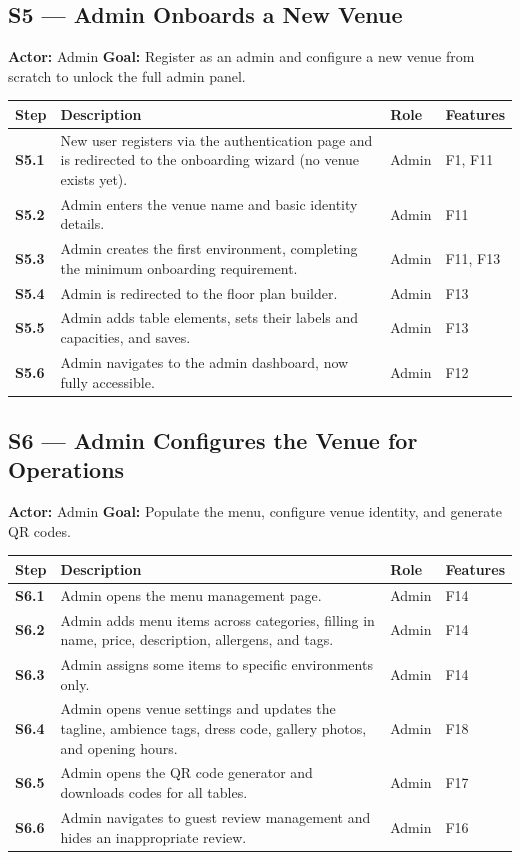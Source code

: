 \documentclass[12pt,a4paper,oneside]{report}
\begin{document}
\subsection*{S5 --- Admin Onboards a New Venue}
\begin{mdframed}[style=scenariobox]
\textbf{Actor:} Admin \quad
\textbf{Goal:} Register as an admin and configure a new venue from scratch
to unlock the full admin panel.
\end{mdframed}

\begin{longtable}{>{\bfseries}l L{6.2cm} l L{2.8cm}}
  \toprule
  Step & Description & Role & Features \\
  \midrule
  S5.1 & New user registers via the authentication page and is redirected to
         the onboarding wizard (no venue exists yet). & Admin & F1, F11 \\
  S5.2 & Admin enters the venue name and basic identity details. & Admin & F11 \\
  S5.3 & Admin creates the first environment, completing the minimum onboarding
         requirement. & Admin & F11, F13 \\
  S5.4 & Admin is redirected to the floor plan builder. & Admin & F13 \\
  S5.5 & Admin adds table elements, sets their labels and capacities, and saves. & Admin & F13 \\
  S5.6 & Admin navigates to the admin dashboard, now fully accessible. & Admin & F12 \\
  \bottomrule
\end{longtable}

\subsection*{S6 --- Admin Configures the Venue for Operations}
\begin{mdframed}[style=scenariobox]
\textbf{Actor:} Admin \quad
\textbf{Goal:} Populate the menu, configure venue identity, and generate QR codes.
\end{mdframed}

\begin{longtable}{>{\bfseries}l L{6.2cm} l L{2.8cm}}
  \toprule
  Step & Description & Role & Features \\
  \midrule
  S6.1 & Admin opens the menu management page. & Admin & F14 \\
  S6.2 & Admin adds menu items across categories, filling in name, price,
         description, allergens, and tags. & Admin & F14 \\
  S6.3 & Admin assigns some items to specific environments only. & Admin & F14 \\
  S6.4 & Admin opens venue settings and updates the tagline, ambience tags,
         dress code, gallery photos, and opening hours. & Admin & F18 \\
  S6.5 & Admin opens the QR code generator and downloads codes for all tables. & Admin & F17 \\
  S6.6 & Admin navigates to guest review management and hides an inappropriate
         review. & Admin & F16 \\
  \bottomrule
\end{longtable}
\end{document}
